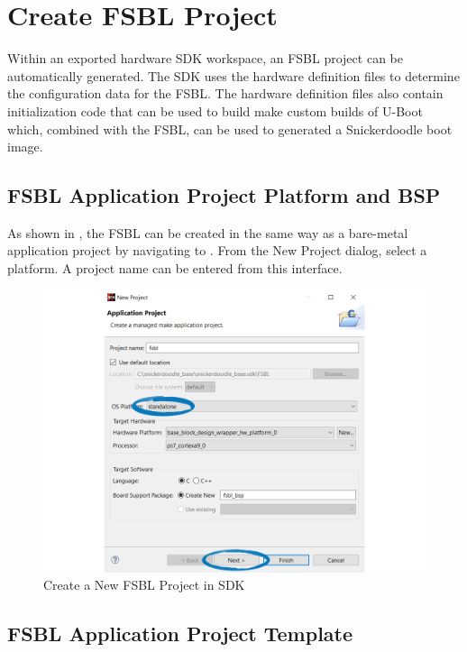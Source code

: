 \section{Create FSBL Project}

Within an exported hardware SDK workspace, an FSBL project can be automatically generated. The SDK uses the hardware definition files to determine the configuration data for the FSBL. The hardware definition files also contain initialization code that can be used to build make custom builds of U-Boot which, combined with the FSBL, can be used to generated a Snickerdoodle boot image.


\subsection{FSBL Application Project Platform and BSP}

As shown in , the FSBL can be created in the same way as a bare-metal application project by navigating to . From the New Project dialog, select a  platform. A project name can be entered from this interface.


\begin{figure}
	\centering
	\includegraphics{images/sdk/FSBL_Project.png}
	\caption{Create a New FSBL Project in SDK}
	\label{fig:createfsblproj}
\end{figure}


\subsection{FSBL Application Project Template}

